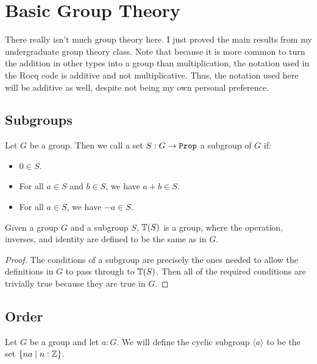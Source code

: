 \documentclass[../../math.tex]{subfiles}
\begin{document}
\setcounter{chapter}{13}

\chapter{Basic Group Theory}

There really isn't much group theory here.  I just proved the main results from
my undergraduate group theory class.  Note that because it is more common to
turn the addition in other types into a group than multiplication, the notation
used in the Rocq code is additive and not multiplicative.  Thus, the notation
used here will be additive as well, despite not being my own personal
preference.

\section{Subgroups}

\begin{definition}
    Let $G$ be a group.  Then we call a set $S : G \to \Prop$ a subgroup of $G$
    if:
    \begin{itemize}
        \item $0 \in S$.
        \item For all $a \in S$ and $b \in S$, we have $a + b \in S$.
        \item For all $a \in S$, we have $-a \in S$.
    \end{itemize}
\end{definition}

\begin{theorem}
    Given a group $G$ and a subgroup $S$, $\mathbb{T}(S)$ is a group, where the
    operation, inverses, and identity are defined to be the same as in $G$.
\end{theorem}
\begin{proof}
    The conditions of a subgroup are precisely the ones needed to allow the
    definitions in $G$ to pass through to $\mathbb{T}(S)$.  Then all of the required
    conditions are trivially true because they are true in $G$.
\end{proof}

\section{Order}

\begin{definition}
    Let $G$ be a group and let $a : G$.  We will define the cyclic subgroup
    $\langle a \rangle$ to be the set $\{na \mid n : \mathbb{Z}\}$.
\end{definition}
\end{document}

